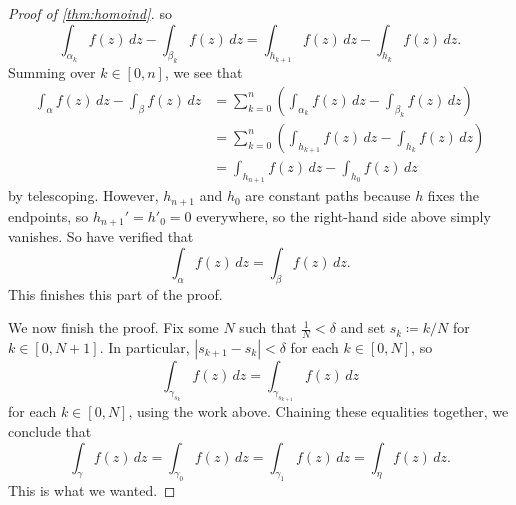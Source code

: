 \documentclass[../notes.tex]{subfiles}
\begin{document}
\begin{proof}[Proof of \autoref{thm:homoind}]
	so
	\[\int_{\alpha_k}f(z)\,dz-\int_{\beta_k}f(z)\,dz=\int_{h_{k+1}}f(z)\,dz-\int_{h_k}f(z)\,dz.\]
	Summing over $k\in[0,n]$, we see that
	\begin{align*}
		\int_\alpha f(z)\,dz-\int_\beta f(z)\,dz &= \sum_{k=0}^n\left(\int_{\alpha_k}f(z)\,dz-\int_{\beta_k}f(z)\,dz\right) \\
		&= \sum_{k=0}^n\left(\int_{h_{k+1}}f(z)\,dz-\int_{h_k}f(z)\,dz\right) \\
		&= \int_{h_{n+1}}f(z)\,dz-\int_{h_0}f(z)\,dz
	\end{align*}
	by telescoping. However, $h_{n+1}$ and $h_0$ are constant paths because $h$ fixes the endpoints, so $h_{n+1}'=h'_0=0$ everywhere, so the right-hand side above simply vanishes. So have verified that
	\[\int_\alpha f(z)\,dz=\int_\beta f(z)\,dz.\]
	This finishes this part of the proof.

	We now finish the proof. Fix some $N$ such that $\frac1N<\delta$ and set $s_k\coloneqq k/N$ for $k\in[0,N+1]$. In particular, $|s_{k+1}-s_k|<\delta$ for each $k\in[0,N]$, so
	\[\int_{\gamma_{s_k}}f(z)\,dz=\int_{\gamma_{s_{k+1}}}f(z)\,dz\]
	for each $k\in[0,N]$, using the work above. Chaining these equalities together, we conclude that
	\[\int_\gamma f(z)\,dz=\int_{\gamma_0}f(z)\,dz=\int_{\gamma_1}f(z)\,dz=\int_\eta f(z)\,dz.\]
	This is what we wanted.
\end{proof}
\end{document}
